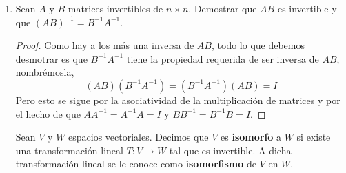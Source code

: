 \documentclass[letterpaper]{article}
\newcommand{\verd}{\textbf{\underline{Verdadero.} }}
\begin{document}
\begin{enumerate}
\begin{enumerate}[label=(\alph*)]
    \verd De hecho sale de un corolario que dice lo siguiente
    \begin{corollary*}
    $A$ es invertible si y sólo si $L_A$ es invertible. Además, $(L_A)^{-1} = L_{A^{-1}}$.
    \begin{proof}
        Sean $\alpha$ y $\beta$ bases ordenadas de $V$ y $W$ respectivamente, entonces
        $[L_A]^\beta_\alpha$. También se tiene que 
        \[
            [L^{-1}_A]^\alpha_\beta=\left([L_A]^\alpha_\beta\right)^{-1} = A^{-1} = [L_{A^{-1}}]^\alpha_\beta
        \]
        y de ahí que $(L_A)^{-1} = L_{A^{-1}}$.
    \end{proof}
    \end{corollary*}

    \item $A$ debe ser cuadrada para poder tener una inversa.
    
    \verd Se sigue de de la definición,

    \begin{definition*}
        Sea $A$ una matriz de $n \times n$. Entonces $A$ es invertible si existe una matríz $B$ de
        $n \times n$ tal que $AB = BA = I$.

        Si $A$ es invertible, entonces la matriz $B$ tal que $AB = BA = I$ es única. La matriz $B$ es llamada
        la \textbf{inversa} de $A$ y es denotada como $A^{-1}$.
    \end{definition*}
\end{enumerate}

\item Sean $A$ y $B$ matrices invertibles de $n \times n$. Demostrar que $AB$ es invertible y que
$(AB)^{-1} = B^{-1} A^{-1}$.
\begin{proof}
Como hay a los más una inversa de $AB$, todo lo que debemos desmotrar es que $B^{-1} A^{-1}$ tiene la
propiedad requerida de ser inversa de $AB$, nombrémosla,
$$ (AB)(B^{-1}A^{-1}) = (B^{-1} A^{-1})(AB) = I $$
Pero esto se sigue por la asociatividad de la multiplicación de matrices y por el hecho de que
$AA^{-1} = A^{-1}A = I$ y $BB^{-1} = B^{-1}B = I$.
\end{proof}

\begin{definition*}
Sean $V$ y $W$ espacios vectoriales. Decimos que $V$ es \textbf{isomorfo} a $W$ si existe una
transformación lineal $T : V \to W$ tal que es invertible. A dicha transformación lineal se le conoce como
\textbf{isomorfismo} de $V$ en $W$.
\end{definition*}


\end{enumerate}
\end{document}
